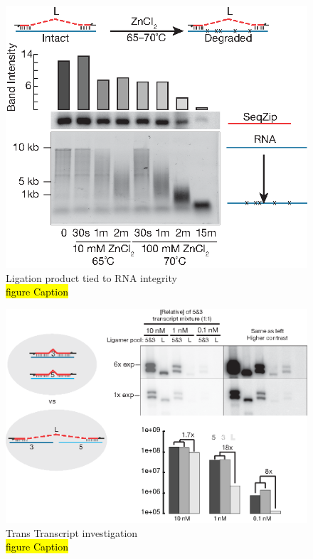 	  \begin{figure}[htbp] %
    	\centering 
    	\includegraphics{Figures/Chapter2/DegreadedRNABySeqZip.eps}
    	\caption[Ligation product tied to RNA integrity]
    	{
		    Ligation product tied to RNA integrity\\
      	\hl{figure Caption}
    		}
    	\label{fig:Ligation product and RNA integrity}
  		\end{figure}

  	\begin{figure}[htbp] %
    	\centering 
    	\includegraphics{Figures/Chapter2/TransRNAWithSeqZip.eps}
    	\caption[Trans Transcript investigation]
    	{
	      Trans Transcript investigation\\
  	    \hl{figure Caption}
		    }
   	 \label{fig:Ligation product and RNA integrity}
	 	 \end{figure}

